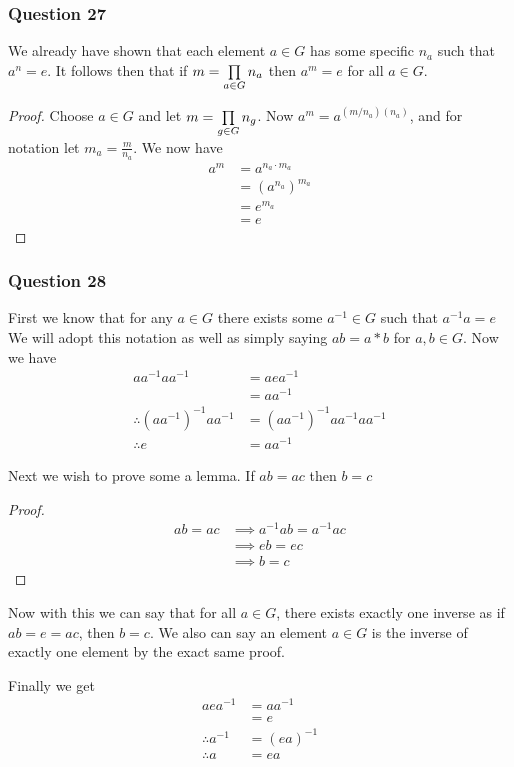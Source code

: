 \documentclass{article}
\begin{document}
\subsubsection{Question 27}

We already have shown that each element $a\in G$ has some specific $n_a$ such that $a^n = e$. It follows then that if $m = {\prod\limits_{a\in G}^{} {n_a} }$ then $a^m = e$ for all $a\in G$.
\begin{proof}
	Choose $a \in G$ and let $m = \prod\limits_{g\in G}^{} {n_g} $. Now $a^m = a^{(m/n_a)(n_a)}$, and for notation let $m_a = \frac m{n_a}$. We now have
	\begin{align*}
	a^m &= a^{n_a\cdot m_a} \\
	&= \left(a^{n_a}\right)^{m_a} \\
	&= e^{m_a} \\
	&= e
	\end{align*}
\end{proof}

\subsubsection{Question 28}

First we know that for any $a \in G$ there exists some $a^{-1} \in G$ such that $a^{-1} a = e$ We will adopt this notation as well as simply saying $ab = a * b$ for $a,b\in G$. Now we have
\begin{align*}
aa^{-1}aa^{-1} &= aea^{-1} \\
&= aa^{-1} \\
\therefore \left(aa^{-1}\right)^{-1}aa^{-1} &= \left(aa^{-1}\right)^{-1}aa^{-1}aa^{-1} \\
\therefore e &= aa^{-1}
\end{align*}

Next we wish to prove some a lemma. If $ab = ac$ then $b = c$
\begin{proof}
	\begin{align*}
	ab = ac &\implies a^{-1}ab = a^{-1}ac \\
	&\implies eb=ec \\
	&\implies b = c
	\end{align*}
\end{proof}

Now with this we can say that for all $a \in G$, there exists exactly one inverse as if $ab = e = ac$, then $b = c$. We also can say an element $a\in G$ is the inverse of exactly one element by the exact same proof.

Finally we get
\begin{align*}
aea^{-1} &= aa^{-1} \\
&= e \\
\therefore a^{-1} &= (ea)^{-1} \\
\therefore a &= ea
\end{align*}
	
\end{document}
